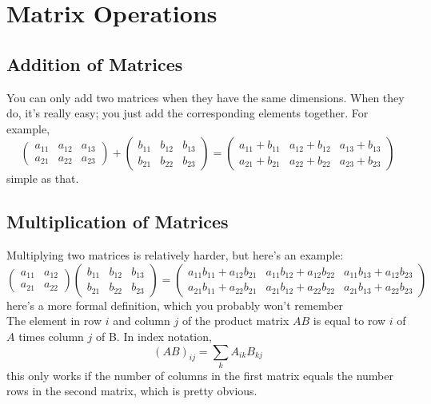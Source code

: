 \documentclass[oneside]{book}
\numberwithin{equation}{chapter} %
\begin{document}
\section{Matrix Operations}
\subsection{Addition of Matrices}
You can only add two matrices when they have the same dimensions. When they do, it's really easy; you just add the corresponding elements together. For example,
$$
\begin{pmatrix}
	a_{11}&a_{12}&a_{13}\\a_{21}&a_{22}&a_{23}
\end{pmatrix}
+
\begin{pmatrix}
	b_{11}&b_{12}&b_{13}\\b_{21}&b_{22}&b_{23}
\end{pmatrix}
=
\begin{pmatrix}
	a_{11}+b_{11}&a_{12}+b_{12}&a_{13}+b_{13}\\a_{21}+b_{21}&a_{22}+b_{22}&a_{23}+b_{23}
\end{pmatrix}
$$
simple as that.
\subsection{Multiplication of Matrices}
Multiplying two matrices is relatively harder, but here's an example:
$$
\begin{pmatrix}
	a_{11}&a_{12}\\a_{21}&a_{22}
\end{pmatrix}
\begin{pmatrix}
	b_{11}&b_{12}&b_{13}\\b_{21}&b_{22}&b_{23}
\end{pmatrix}
=
\begin{pmatrix}
	a_{11}b_{11}+a_{12}b_{21}&a_{11}b_{12}+a_{12}b_{22}&a_{11}b_{13}+a_{12}b_{23}\\a_{21}b_{11}+a_{22}b_{21}&a_{21}b_{12}+a_{22}b_{22}&a_{21}b_{13}+a_{22}b_{23}
\end{pmatrix}
$$
here's a more formal definition, which you probably won't remember \\

The element in row $i$ and column $j$ of the product matrix $AB$ is equal to row $i$ of $A$ times column $j$ of B. In index notation,
\begin{equation}
	(AB)_{ij}=\sum_kA_{ik}B_{kj}
\end{equation}
this only works if the number of columns in the first matrix equals the number rows in the second matrix, which is pretty obvious. \\
\end{document}
